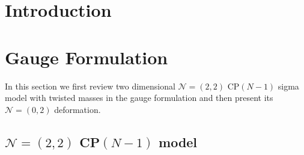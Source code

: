 \documentclass[12pt]{article}
\newcommand{\ntwot}{${\mathcal N}= \left(2,2\right) $ }
\newcommand{\ntwoo}{${\mathcal N}= \left(0,2\right) $ }
\begin{document}
%
%
\section{Introduction}

%
%
\section{Gauge Formulation}
\label{gaugef}

In this section we first review two dimensional \ntwot
CP$(N-1)$ sigma model with twisted masses in the 
gauge formulation and then present its \ntwoo deformation.

\subsection{ \ntwot CP$(N-1)$  model}
\end{document}
